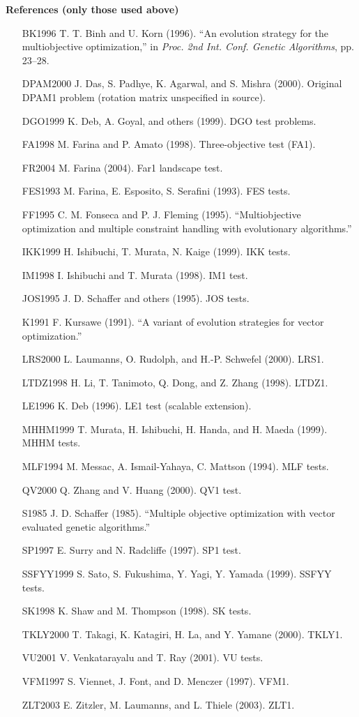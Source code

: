 \documentclass[12pt,a4paper]{article}
\begin{document}
\textbf{References (only those used above)}\\[-0.5em]
\begin{itemize}[leftmargin=3.5em]
\item[BK1996] T. T. Binh and U. Korn (1996). ``An evolution strategy for the multiobjective optimization,'' in \emph{Proc. 2nd Int. Conf. Genetic Algorithms}, pp. 23--28.
\item[DPAM2000] J. Das, S. Padhye, K. Agarwal, and S. Mishra (2000). Original DPAM1 problem (rotation matrix unspecified in source).
\item[DGO1999] K. Deb, A. Goyal, and others (1999). DGO test problems.
\item[FA1998] M. Farina and P. Amato (1998). Three-objective test (FA1).
\item[FR2004] M. Farina (2004). Far1 landscape test.
\item[FES1993] M. Farina, E. Esposito, S. Serafini (1993). FES tests.
\item[FF1995] C. M. Fonseca and P. J. Fleming (1995). ``Multiobjective optimization and multiple constraint handling with evolutionary algorithms.''
\item[IKK1999] H. Ishibuchi, T. Murata, N. Kaige (1999). IKK tests.
\item[IM1998] I. Ishibuchi and T. Murata (1998). IM1 test.
\item[JOS1995] J. D. Schaffer and others (1995). JOS tests.
\item[K1991] F. Kursawe (1991). ``A variant of evolution strategies for vector optimization.''
\item[LRS2000] L. Laumanns, O. Rudolph, and H.-P. Schwefel (2000). LRS1.
\item[LTDZ1998] H. Li, T. Tanimoto, Q. Dong, and Z. Zhang (1998). LTDZ1.
\item[LE1996] K. Deb (1996). LE1 test (scalable extension).
\item[MHHM1999] T. Murata, H. Ishibuchi, H. Handa, and H. Maeda (1999). MHHM tests.
\item[MLF1994] M. Messac, A. Ismail-Yahaya, C. Mattson (1994). MLF tests.
\item[QV2000] Q. Zhang and V. Huang (2000). QV1 test.
\item[S1985] J. D. Schaffer (1985). ``Multiple objective optimization with vector evaluated genetic algorithms.''
\item[SP1997] E. Surry and N. Radcliffe (1997). SP1 test.
\item[SSFYY1999] S. Sato, S. Fukushima, Y. Yagi, Y. Yamada (1999). SSFYY tests.
\item[SK1998] K. Shaw and M. Thompson (1998). SK tests.
\item[TKLY2000] T. Takagi, K. Katagiri, H. La, and Y. Yamane (2000). TKLY1.
\item[VU2001] V. Venkatarayalu and T. Ray (2001). VU tests.
\item[VFM1997] S. Viennet, J. Font, and D. Menczer (1997). VFM1.
\item[ZLT2003] E. Zitzler, M. Laumanns, and L. Thiele (2003). ZLT1.
\end{itemize}
\end{document}
